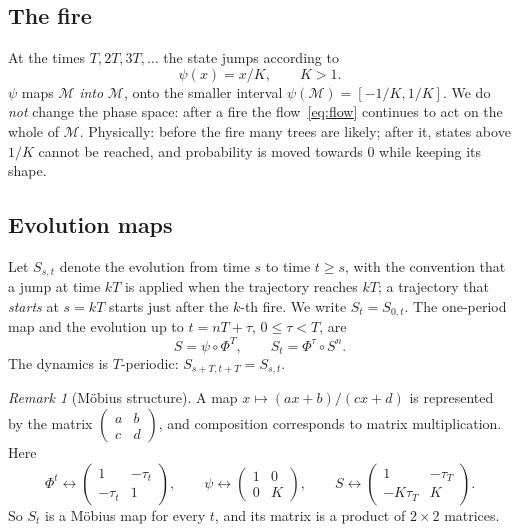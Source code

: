 \documentclass[11pt,a4paper]{article}
\theoremstyle{remark}
\newtheorem{remark}{Remark}
\newcommand{\M}{\mathcal{M}}
\begin{document}
\subsection{The fire}
At the times $T,2T,3T,\dots$ the state jumps according to
\begin{equation}
  \psi(x) = x/K, \qquad K>1 .
\end{equation}
$\psi$ maps $\M$ \emph{into} $\M$, onto the smaller interval
$\psi(\M)=[-1/K,1/K]$. We do \emph{not} change the phase space: after a fire
the flow~\eqref{eq:flow} continues to act on the whole of $\M$. Physically:
before the fire many trees are likely; after it, states above $1/K$ cannot be
reached, and probability is moved towards $0$ while keeping its shape.

\subsection{Evolution maps}
Let $S_{s,t}$ denote the evolution from time $s$ to time $t\ge s$, with the
convention that a jump at time $kT$ is applied when the trajectory reaches
$kT$; a trajectory that \emph{starts} at $s=kT$ starts just after the $k$-th
fire. We write $S_t=S_{0,t}$. The one-period map and the evolution up to
$t=nT+\tau$, $0\le\tau<T$, are
\begin{equation}
  S = \psi\circ\Phi^T, \qquad S_t = \Phi^\tau\circ S^n .
\end{equation}
The dynamics is $T$-periodic: $S_{s+T,t+T}=S_{s,t}$.

\begin{remark}[M\"obius structure]
A map $x\mapsto (ax+b)/(cx+d)$ is represented by the matrix
$\left(\begin{smallmatrix}a&b\\c&d\end{smallmatrix}\right)$, and composition
corresponds to matrix multiplication. Here
\begin{equation}
  \Phi^t \leftrightarrow \begin{pmatrix}1&-\tau_t\\-\tau_t&1\end{pmatrix},\qquad
  \psi \leftrightarrow \begin{pmatrix}1&0\\0&K\end{pmatrix},\qquad
  S \leftrightarrow \begin{pmatrix}1&-\tau_T\\-K\tau_T&K\end{pmatrix}.
\end{equation}
So $S_t$ is a M\"obius map for every $t$, and its matrix is a product of
$2\times2$ matrices.
\end{remark}
\end{document}
